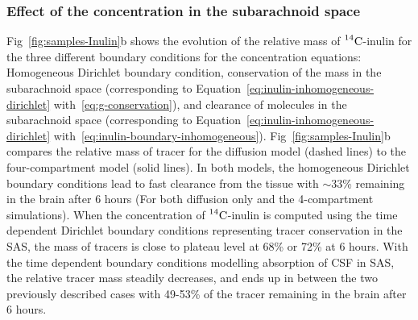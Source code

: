 \documentclass[10pt]{article}
\newcommand{\1}{^{(1)}}
\newcommand{\2}{^{(2)}}
\newcommand{\Cinulin}{$\prescript{14}{}{\text{C}}$-inulin }
\newcommand{\commentout}[1]{}
\begin{document}
\subsubsection{Effect of the concentration in the subarachnoid space}
Fig~\ref{fig:samples-Inulin}b shows the evolution of the relative mass of \Cinulin for the three different boundary conditions for the concentration equations: Homogeneous Dirichlet boundary condition, conservation of the mass in the subarachnoid space (corresponding to Equation~\eqref{eq:inulin-inhomogeneous-dirichlet} with~\eqref{eq:g-conservation}), and clearance of molecules in the subarachnoid space (corresponding to Equation~\eqref{eq:inulin-inhomogeneous-dirichlet} with~\eqref{eq:inulin-boundary-inhomogeneous}). Fig~\ref{fig:samples-Inulin}b compares the relative mass of tracer for the diffusion model (dashed lines) to the four-compartment model (solid lines). In both models, the homogeneous Dirichlet boundary conditions lead to fast clearance from the tissue with $\sim33$\% remaining in the brain after 6 hours (For both diffusion only and the 4-compartment simulations). When the concentration of \Cinulin is computed using the time dependent Dirichlet boundary conditions representing tracer conservation in the SAS, the mass of tracers is close to plateau level at 68\% or 72\% at 6 hours. With the time dependent boundary conditions modelling absorption of CSF in SAS, the relative tracer mass steadily decreases, and ends up in between the two previously described cases with 49-53\%  of the tracer remaining in the brain after 6 hours. 
\commentout{
 \begin{figure}[htbp]
     \centering
     \begin{subfigure}[t]{0.45\textwidth}
         \captionsetup{width=0.9\textwidth}
         \centering
         \caption{Single diffusion equation}
         \label{fig:diffusion-bcs-Inulin}
     \end{subfigure}
     \hfill
     \begin{subfigure}[t]{0.45\textwidth}
         \captionsetup{width=0.9\textwidth}
         \centering
         \caption{Multi-compartment model.}
         \label{fig:multi-compartment-bcs-Inulin}
     \end{subfigure}
     \caption{Relative \Cinulin mass located in the totality of the brain for the different boundary conditions.}
     \label{fig:bcs-Inulin}
\end{figure}
\begin{figure}
    \centering
    \caption{Relative \Cinulin mass located in the totality of the brain for the different boundary conditions. Solid lines result from the multi-compartment model simulations while dashed lines result from diffusion only in the ECS.}
   \label{fig:bcs-Inulin}
\end{figure}
}
\end{document}
